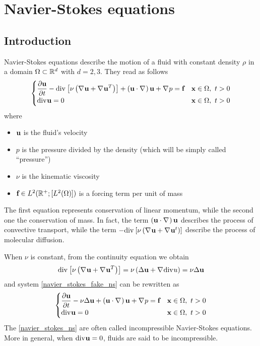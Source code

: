 \newpage 
\section{Navier-Stokes equations}
\subsection{Introduction}
Navier-Stokes equations describe the motion of a fluid with constant density \(\rho\) in a domain \(\Omega \subset \mathbb{R}^d\) with \(d = 2,3\). They read as follows
\begin{equation}
    \begin{cases}
        \displaystyle \partialderivative{\uvec}{t} - \div \left[ \nu \left( \grad \uvec + \grad \uvec^T \right) \right] + \left( \uvec \cdot \grad \right) \uvec + \grad p = \vect{f} & \xvec \in \Omega, \ t > 0 \\
        \div \uvec = 0 & \xvec \in \Omega, \ t > 0
    \end{cases}
    \label{navier_stokes_fake_ns}
\end{equation}
where 
\begin{itemize}
    \item \(\textbf{u}\) is the fluid's velocity
    \item \(p\) is the pressure divided by the density (which will be simply called ``pressure'')
    \item \(\nu\) is the kinematic viscosity 
    \item \(\textbf{f} \in L^2(\mathbb{R}^+; [L^2(\Omega)])\) is a forcing term per unit of mass
\end{itemize}
The first equation represents conservation of linear momentum, while the second one the conservation of mass. In fact, the term \(\left( \textbf{u} \cdot \nabla\mspace{1mu} \right)\textbf{u}\) describes the process of convective transport, while the term \(-\text{div}\mspace{1mu} \left[ \nu \left( \nabla\mspace{1mu} \textbf{u} + \nabla\mspace{1mu} \textbf{u}^t \right) \right]\) describe the process of molecular diffusion.

When \(\nu\) is constant, from the continuity equation we obtain 
\[
    \text{div}\mspace{1mu} \left[ \nu \left( \nabla\mspace{1mu} \textbf{u} + \nabla\mspace{1mu} \textbf{u}^T \right) \right] = \nu \left( \Delta \textbf{u} +\nabla\mspace{1mu} \text{div}\mspace{1mu} u \right) = \nu\Delta \textbf{u}
\]
and system \eqref{navier_stokes_fake_ns} can be rewritten as 
\begin{equation}
    \begin{cases}
        \displaystyle \partialderivative{\uvec}{t} - \nu \Delta \uvec + \left( \uvec \cdot \grad \right) \uvec + \grad p = \vect{f} & \xvec \in \Omega, \ t > 0 \\
        \div\uvec = 0 & \xvec \in \Omega, \ t > 0
    \end{cases}
    \label{navier_stokes_ns}
\end{equation}
The \eqref{navier_stokes_ns} are often called incompressible Navier-Stokes equations. More in general, when \(\text{div}\mspace{1mu}\textbf{u} = 0\), fluids are said to be incompressible. 

